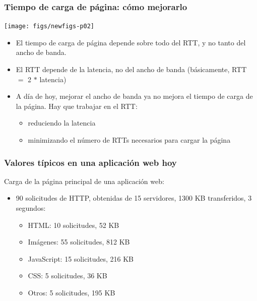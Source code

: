 \documentclass[hyperref={pdfpagelabels=true},ucs]{beamer}
\begin{document}
\begin{frame}[fragile]
\frametitle{Tiempo de carga de página: cómo mejorarlo}

\vspace{-3mm}
\begin{center}
\texttt{[image: figs/newfigs-p02]}
\end{center}

\begin{itemize}
\item El tiempo de carga de página depende sobre todo del RTT, y no
  tanto del ancho de banda.
\item El RTT depende de la latencia, no del ancho de banda
  (básicamente, RTT $=$ 2 $*$ latencia)
\item A día de hoy, mejorar el ancho de banda ya no mejora el tiempo
  de carga de la página. Hay que trabajar en el RTT:
  \begin{itemize}
  \item reduciendo la latencia
  \item minimizando el número de RTTs necesarios para cargar la página
  \end{itemize}
\end{itemize}

\end{frame}





\begin{frame}[fragile]
\frametitle{Valores típicos en una aplicación web hoy}

Carga de la página principal de una aplicación web:
\begin{itemize}
\item 90 solicitudes de HTTP, obtenidas de 15 servidores, 1300 KB
  transferidos, 3 segundos:
  \begin{itemize}
  \item HTML: 10 solicitudes, 52 KB
  \item Imágenes: 55 solicitudes, 812 KB
  \item JavaScript: 15 solicitudes, 216 KB
  \item CSS: 5 solicitudes, 36 KB
  \item Otros: 5 solicitudes, 195 KB
  \end{itemize}
\end{itemize}



\end{frame}
\end{document}
